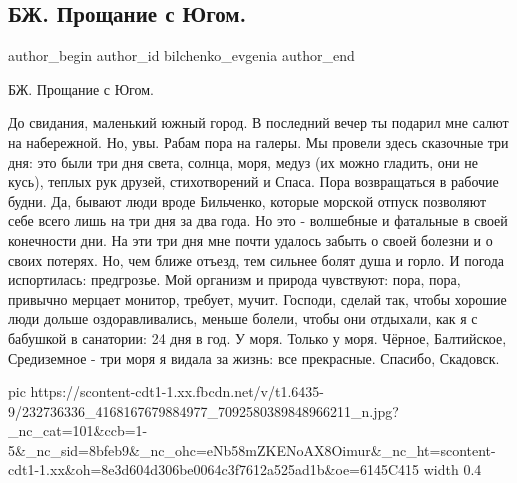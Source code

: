  
 
 
 
 
 
\subsection{БЖ. Прощание с Югом.}
\label{sec:19_08_2021.fb.bilchenko_evgenia.4.proschanie_s_jugom}
 
\ifcmt
 author_begin
   author_id bilchenko_evgenia
 author_end
\fi

БЖ. Прощание с Югом. 

До свидания, маленький южный город. В последний вечер ты подарил мне салют на
набережной. Но, увы. Рабам пора на галеры. Мы провели здесь сказочные три дня:
это были три дня света, солнца, моря, медуз (их можно гладить, они не кусь),
теплых рук друзей, стихотворений и Спаса. Пора возвращаться в рабочие будни.
Да, бывают люди вроде Бильченко, которые морской отпуск позволяют себе всего
лишь на три дня за два года. Но это - волшебные и фатальные в своей конечности
дни. На эти три дня мне почти удалось забыть о своей болезни и о своих потерях.
Но, чем ближе отъезд, тем сильнее болят душа и горло. И погода испортилась:
предгрозье. Мой организм и природа чувствуют: пора, пора, привычно мерцает
монитор, требует, мучит. Господи, сделай так, чтобы хорошие люди дольше
оздоравливались, меньше болели, чтобы они отдыхали, как я с бабушкой в
санатории: 24 дня в год. У моря. Только у моря. Чёрное, Балтийское, Средиземное
- три моря я видала за жизнь: все прекрасные. Спасибо, Скадовск.

\ifcmt
  pic https://scontent-cdt1-1.xx.fbcdn.net/v/t1.6435-9/232736336_4168167679884977_7092580389848966211_n.jpg?_nc_cat=101&ccb=1-5&_nc_sid=8bfeb9&_nc_ohc=eNb58mZKENoAX8Oimur&_nc_ht=scontent-cdt1-1.xx&oh=8e3d604d306be0064c3f7612a525ad1b&oe=6145C415
  width 0.4
\fi

